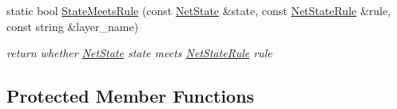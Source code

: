 \begin{DoxyCompactItemize}
static bool \mbox{\hyperlink{classcaffe_1_1_net_ae46e9be7aee32f16bcfcc8639afdd949}{State\+Meets\+Rule}} (const \mbox{\hyperlink{classcaffe_1_1_net_state}{Net\+State}} \&state, const \mbox{\hyperlink{classcaffe_1_1_net_state_rule}{Net\+State\+Rule}} \&rule, const string \&layer\+\_\+name)
\begin{DoxyCompactList}\small\item\em return whether \mbox{\hyperlink{classcaffe_1_1_net_state}{Net\+State}} state meets \mbox{\hyperlink{classcaffe_1_1_net_state_rule}{Net\+State\+Rule}} rule \end{DoxyCompactList}\end{DoxyCompactItemize}
\subsection*{Protected Member Functions}
